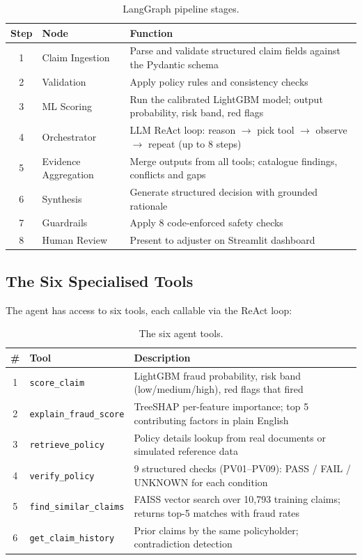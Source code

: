\documentclass[12pt,a4paper]{article}
\begin{document}
\begin{table}[H]
\centering
\caption{LangGraph pipeline stages.}
\label{tab:pipeline}
\begin{tabular}{@{}clp{8cm}@{}}
\toprule
\textbf{Step} & \textbf{Node} & \textbf{Function} \\
\midrule
1 & Claim Ingestion       & Parse and validate structured claim fields against the Pydantic schema \\
2 & Validation            & Apply policy rules and consistency checks \\
3 & ML Scoring            & Run the calibrated LightGBM model; output probability, risk band, red flags \\
4 & Orchestrator          & LLM ReAct loop: reason $\rightarrow$ pick tool $\rightarrow$ observe $\rightarrow$ repeat (up to 8 steps) \\
5 & Evidence Aggregation  & Merge outputs from all tools; catalogue findings, conflicts and gaps \\
6 & Synthesis             & Generate structured decision with grounded rationale \\
7 & Guardrails            & Apply 8 code-enforced safety checks \\
8 & Human Review          & Present to adjuster on Streamlit dashboard \\
\bottomrule
\end{tabular}
\end{table}

\subsection{The Six Specialised Tools}

The agent has access to six tools, each callable via the ReAct loop:

\begin{table}[H]
\centering
\caption{The six agent tools.}
\label{tab:tools}
\begin{tabular}{@{}clp{7.5cm}@{}}
\toprule
\textbf{\#} & \textbf{Tool} & \textbf{Description} \\
\midrule
1 & \texttt{score\_claim}           & LightGBM fraud probability, risk band (low/medium/high), red flags that fired \\
2 & \texttt{explain\_fraud\_score}  & TreeSHAP per-feature importance; top 5 contributing factors in plain English \\
3 & \texttt{retrieve\_policy}       & Policy details lookup from real documents or simulated reference data \\
4 & \texttt{verify\_policy}         & 9 structured checks (PV01--PV09): PASS / FAIL / UNKNOWN for each condition \\
5 & \texttt{find\_similar\_claims}  & FAISS vector search over 10,793 training claims; returns top-5 matches with fraud rates \\
6 & \texttt{get\_claim\_history}    & Prior claims by the same policyholder; contradiction detection \\
\bottomrule
\end{tabular}
\end{table}
\end{document}
